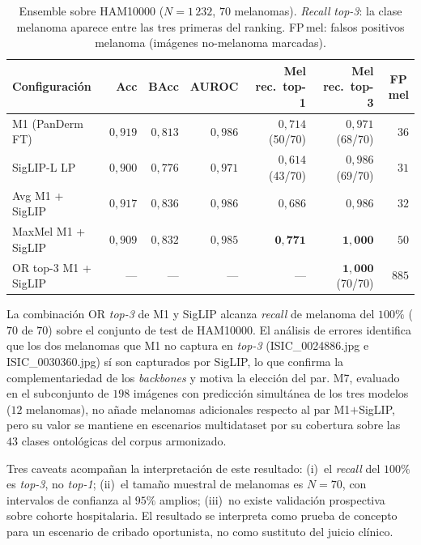 \begin{table}[H]
\centering
\footnotesize
\setlength{\tabcolsep}{4pt}
\renewcommand{\arraystretch}{0.95}
\caption{Ensemble sobre HAM10000 ($N = 1\,232$, $70$ melanomas).
\emph{Recall} \emph{top-3}: la clase melanoma aparece entre las
tres primeras del ranking. FP\,mel: falsos positivos melanoma
(imágenes no-melanoma marcadas).}
\label{tab:ensemble}
\begin{tabular}{lrrrrrr}
\hline
Configuración                   & Acc           & BAcc          & AUROC         & Mel rec.\ top-1 & Mel rec.\ top-3 & FP\,mel \\
\hline
M1 (PanDerm FT)                 & $0{,}919$     & $0{,}813$     & $0{,}986$     & $0{,}714$ (50/70) & $0{,}971$ (68/70) & $36$ \\
SigLIP-L LP                     & $0{,}900$     & $0{,}776$     & $0{,}971$     & $0{,}614$ (43/70) & $0{,}986$ (69/70) & $31$ \\
Avg M1 + SigLIP                 & $0{,}917$     & $0{,}836$     & $0{,}986$     & $0{,}686$         & $0{,}986$         & $32$ \\
MaxMel M1 + SigLIP              & $0{,}909$     & $0{,}832$     & $0{,}985$     & $\mathbf{0{,}771}$ & $\mathbf{1{,}000}$ & $50$ \\
OR top-3 M1 + SigLIP            & ---           & ---           & ---           & ---               & $\mathbf{1{,}000}$ (70/70) & $885$ \\
\hline
\end{tabular}
\end{table}

La combinación OR \emph{top-3} de M1 y SigLIP alcanza
\emph{recall} de melanoma del $100\%$ ($70$ de $70$)
sobre el conjunto de test de HAM10000. El análisis de errores
identifica que los dos melanomas que M1 no captura en
\emph{top-3} (ISIC\_0024886.jpg e ISIC\_0030360.jpg) sí son
capturados por SigLIP, lo que confirma la complementariedad de los
\emph{backbones} y motiva la elección del par. M7, evaluado en el
subconjunto de $198$ imágenes con predicción simultánea de los
tres modelos ($12$ melanomas), no añade melanomas adicionales
respecto al par M1$+$SigLIP, pero su valor se mantiene en escenarios
multidataset por su cobertura sobre las $43$ clases
ontológicas del corpus armonizado.

Tres caveats acompañan la interpretación de este resultado: (i)~el
\emph{recall} del $100\%$ es \emph{top-3}, no \emph{top-1};
(ii)~el tamaño muestral de melanomas es $N = 70$, con intervalos
de confianza al $95\%$ amplios; (iii)~no existe validación
prospectiva sobre cohorte hospitalaria. El resultado se interpreta
como prueba de concepto para un escenario de cribado oportunista,
no como sustituto del juicio clínico.

